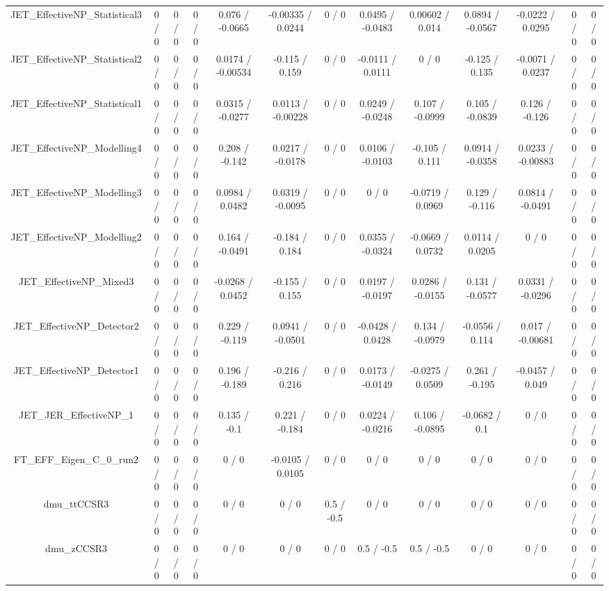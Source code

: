 \documentclass[10pt]{article}
\begin{document}
\begin{table}[htbp]
\begin{center}
\begin{tabular}{|c|c|c|c|c|c|c|c|c|c|c|c|c|}
  JET_EffectiveNP_Statistical3 & 0 / 0 & 0 / 0 & 0 / 0 & 0.076 / -0.0665 & -0.00335 / 0.0244 & 0 / 0 & 0.0495 / -0.0483 & 0.00602 / 0.014 & 0.0894 / -0.0567 & -0.0222 / 0.0295 & 0 / 0 & 0 / 0 \\ 
  JET_EffectiveNP_Statistical2 & 0 / 0 & 0 / 0 & 0 / 0 & 0.0174 / -0.00534 & -0.115 / 0.159 & 0 / 0 & -0.0111 / 0.0111 & 0 / 0 & -0.125 / 0.135 & -0.0071 / 0.0237 & 0 / 0 & 0 / 0 \\ 
  JET_EffectiveNP_Statistical1 & 0 / 0 & 0 / 0 & 0 / 0 & 0.0315 / -0.0277 & 0.0113 / -0.00228 & 0 / 0 & 0.0249 / -0.0248 & 0.107 / -0.0999 & 0.105 / -0.0839 & 0.126 / -0.126 & 0 / 0 & 0 / 0 \\ 
  JET_EffectiveNP_Modelling4 & 0 / 0 & 0 / 0 & 0 / 0 & 0.208 / -0.142 & 0.0217 / -0.0178 & 0 / 0 & 0.0106 / -0.0103 & -0.105 / 0.111 & 0.0914 / -0.0358 & 0.0233 / -0.00883 & 0 / 0 & 0 / 0 \\ 
  JET_EffectiveNP_Modelling3 & 0 / 0 & 0 / 0 & 0 / 0 & 0.0984 / 0.0482 & 0.0319 / -0.0095 & 0 / 0 & 0 / 0 & -0.0719 / 0.0969 & 0.129 / -0.116 & 0.0814 / -0.0491 & 0 / 0 & 0 / 0 \\ 
  JET_EffectiveNP_Modelling2 & 0 / 0 & 0 / 0 & 0 / 0 & 0.164 / -0.0491 & -0.184 / 0.184 & 0 / 0 & 0.0355 / -0.0324 & -0.0669 / 0.0732 & 0.0114 / 0.0205 & 0 / 0 & 0 / 0 & 0 / 0 \\ 
  JET_EffectiveNP_Mixed3 & 0 / 0 & 0 / 0 & 0 / 0 & -0.0268 / 0.0452 & -0.155 / 0.155 & 0 / 0 & 0.0197 / -0.0197 & 0.0286 / -0.0155 & 0.131 / -0.0577 & 0.0331 / -0.0296 & 0 / 0 & 0 / 0 \\ 
  JET_EffectiveNP_Detector2 & 0 / 0 & 0 / 0 & 0 / 0 & 0.229 / -0.119 & 0.0941 / -0.0501 & 0 / 0 & -0.0428 / 0.0428 & 0.134 / -0.0979 & -0.0556 / 0.114 & 0.017 / -0.00681 & 0 / 0 & 0 / 0 \\ 
  JET_EffectiveNP_Detector1 & 0 / 0 & 0 / 0 & 0 / 0 & 0.196 / -0.189 & -0.216 / 0.216 & 0 / 0 & 0.0173 / -0.0149 & -0.0275 / 0.0509 & 0.261 / -0.195 & -0.0457 / 0.049 & 0 / 0 & 0 / 0 \\ 
  JET_JER_EffectiveNP_1 & 0 / 0 & 0 / 0 & 0 / 0 & 0.135 / -0.1 & 0.221 / -0.184 & 0 / 0 & 0.0224 / -0.0216 & 0.106 / -0.0895 & -0.0682 / 0.1 & 0 / 0 & 0 / 0 & 0 / 0 \\ 
  FT_EFF_Eigen_C_0_run2 & 0 / 0 & 0 / 0 & 0 / 0 & 0 / 0 & -0.0105 / 0.0105 & 0 / 0 & 0 / 0 & 0 / 0 & 0 / 0 & 0 / 0 & 0 / 0 & 0 / 0 \\ 
  dmu_ttCCSR3 & 0 / 0 & 0 / 0 & 0 / 0 & 0 / 0 & 0 / 0 & 0.5 / -0.5 & 0 / 0 & 0 / 0 & 0 / 0 & 0 / 0 & 0 / 0 & 0 / 0 \\ 
  dmu_zCCSR3 & 0 / 0 & 0 / 0 & 0 / 0 & 0 / 0 & 0 / 0 & 0 / 0 & 0.5 / -0.5 & 0.5 / -0.5 & 0 / 0 & 0 / 0 & 0 / 0 & 0 / 0 \\ 

\end{tabular}
\end{center}
\end{table}
\end{document}
